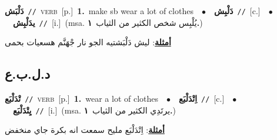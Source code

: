 \documentclass[10pt,a4paper,twoside]{article} %
\begin{document}
\begin{multicols}{2}
{\setlength\topsep{0pt}\textbf{\foreignlanguage{arabic}{دَلْبَش}}\ {\color{gray}\texttt{//}\color{black}}\ \textsc{verb}\ [p.]\ \textbf{1.}~make sb wear a lot of clothes\ \ $\bullet$\ \ \setlength\topsep{0pt}\textbf{\foreignlanguage{arabic}{دَلْبِش}}\ {\color{gray}\texttt{//}\color{black}}\ [c.]\ \ $\bullet$\ \ \setlength\topsep{0pt}\textbf{\foreignlanguage{arabic}{يدَلْبِش}}\ {\color{gray}\texttt{//}\color{black}}\ [i.]\ \color{gray}(msa. \foreignlanguage{arabic}{يُلْبِس شخص الكثير من الثياب}~\foreignlanguage{arabic}{\textbf{١.}})\color{black}\  \begin{flushright}\color{gray}\foreignlanguage{arabic}{\textbf{\underline{\foreignlanguage{arabic}{أمثلة}}}: ليش دَلْبَشتيه الجو نار جْهَنَّم هسعيات بحمى}\end{flushright}\color{black}} \vspace{2mm}

\vspace{-3mm}
\subsection*{\color{blue}\foreignlanguage{arabic}{د.ل.ب.ع}\color{blue}{}} 

{\setlength\topsep{0pt}\textbf{\foreignlanguage{arabic}{تْدَلْبَع}}\ {\color{gray}\texttt{//}\color{black}}\ \textsc{verb}\ [p.]\ \textbf{1.}~wear a lot of clothes\ \ $\bullet$\ \ \setlength\topsep{0pt}\textbf{\foreignlanguage{arabic}{اِتْدَلْبَع}}\ {\color{gray}\texttt{//}\color{black}}\ [c.]\ \ $\bullet$\ \ \setlength\topsep{0pt}\textbf{\foreignlanguage{arabic}{يِتْدَلْبَع}}\ {\color{gray}\texttt{//}\color{black}}\ [i.]\ \color{gray}(msa. \foreignlanguage{arabic}{يرتَدِي الكثير من الثياب}~\foreignlanguage{arabic}{\textbf{١.}})\color{black}\  \begin{flushright}\color{gray}\foreignlanguage{arabic}{\textbf{\underline{\foreignlanguage{arabic}{أمثلة}}}: اِتْدَلْبَع مليح سمعت انه بكرة جاي منخفض}\end{flushright}\color{black}} \vspace{2mm}


\end{multicols}
\end{document}
